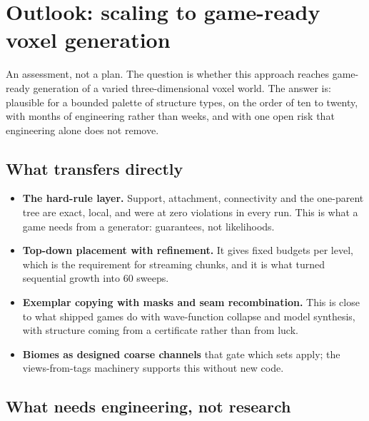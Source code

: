 \documentclass[11pt]{article}
\newcommand{\1}{\mathds{1}}
\begin{document}
\section{Outlook: scaling to game-ready voxel generation}
\label{sec:outlook}

An assessment, not a plan. The question is whether this approach reaches
game-ready generation of a varied three-dimensional voxel world. The
answer is: plausible for a bounded palette of structure types, on the
order of ten to twenty, with months of engineering rather than weeks, and
with one open risk that engineering alone does not remove.

\subsection{What transfers directly}

\begin{itemize}
\item \textbf{The hard-rule layer.} Support, attachment, connectivity and
  the one-parent tree are exact, local, and were at zero violations in
  every run. This is what a game needs from a generator: guarantees, not
  likelihoods.
\item \textbf{Top-down placement with refinement.} It gives fixed budgets
  per level, which is the requirement for streaming chunks, and it is
  what turned sequential growth into 60 sweeps.
\item \textbf{Exemplar copying with masks and seam recombination.} This is
  close to what shipped games do with wave-function collapse and model
  synthesis, with structure coming from a certificate rather than from
  luck.
\item \textbf{Biomes as designed coarse channels} that gate which sets
  apply; the views-from-tags machinery supports this without new code.
\end{itemize}

\subsection{What needs engineering, not research}
\end{document}
